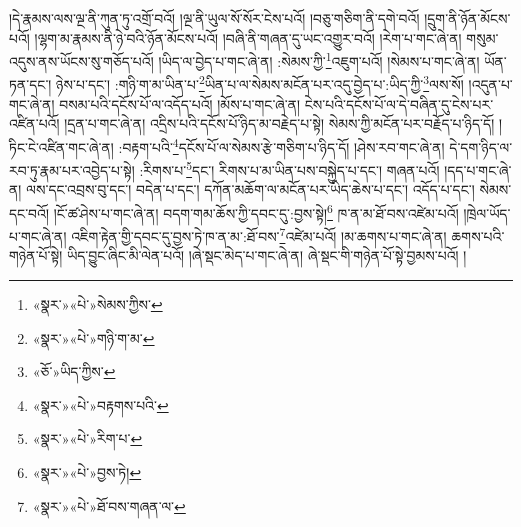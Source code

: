 །དེ་རྣམས་ལས་ལྔ་ནི་ཀུན་ཏུ་འགྲོ་བའོ། །ལྔ་ནི་ཡུལ་སོ་སོར་ངེས་པའོ། །བཅུ་གཅིག་ནི་དགེ་བའོ། །དྲུག་ནི་ཉོན་མོངས་པའོ། །ལྷག་མ་རྣམས་ནི་ཉེ་བའི་ཉོན་མོངས་པའོ། །བཞི་ནི་གཞན་དུ་ཡང་འགྱུར་བའོ། །རེག་པ་གང་ཞེ་ན། གསུམ་འདུས་ནས་ཡོངས་སུ་གཅོད་པའོ། །ཡིད་ལ་བྱེད་པ་གང་ཞེ་ན། :སེམས་ཀྱི་\footnote{«སྣར་»«པེ་»སེམས་ཀྱིས་}འཇུག་པའོ། །སེམས་པ་གང་ཞེ་ན། ཡོན་ཏན་དང་། ཉེས་པ་དང་། :གཉི་ག་མ་ཡིན་པ་\footnote{«སྣར་»«པེ་»གཉི་ག་མ་}ཡིན་པ་ལ་སེམས་མངོན་པར་འདུ་བྱེད་པ་:ཡིད་ཀྱི་\footnote{«ཅོ་»ཡིད་ཀྱིས་}ལས་སོ། །འདུན་པ་གང་ཞེ་ན། བསམ་པའི་དངོས་པོ་ལ་འདོད་པའོ། །མོས་པ་གང་ཞེ་ན། ངེས་པའི་དངོས་པོ་ལ་དེ་བཞིན་དུ་ངེས་པར་འཛིན་པའོ། །དྲན་པ་གང་ཞེ་ན། འདྲིས་པའི་དངོས་པོ་ཉིད་མ་བརྗེད་པ་སྟེ། སེམས་ཀྱི་མངོན་པར་བརྗོད་པ་ཉིད་དོ། །ཏིང་ངེ་འཛིན་གང་ཞེ་ན། :བརྟག་པའི་\footnote{«སྣར་»«པེ་»བརྟགས་པའི་}དངོས་པོ་ལ་སེམས་རྩེ་གཅིག་པ་ཉིད་དོ། །ཤེས་རབ་གང་ཞེ་ན། དེ་དག་ཉིད་ལ་རབ་ཏུ་རྣམ་པར་འབྱེད་པ་སྟེ། :རིགས་པ་\footnote{«སྣར་»«པེ་»རིག་པ་}དང་། རིགས་པ་མ་ཡིན་པས་བསྐྱེད་པ་དང་། གཞན་པའོ། །དད་པ་གང་ཞེ་ན། ལས་དང་འབྲས་བུ་དང་། བདེན་པ་དང་། དཀོན་མཆོག་ལ་མངོན་པར་ཡིད་ཆེས་པ་དང་། འདོད་པ་དང་། སེམས་དང་བའོ། །ངོ་ཚ་ཤེས་པ་གང་ཞེ་ན། བདག་གམ་ཆོས་ཀྱི་དབང་དུ་:བྱས་སྟེ།\footnote{«སྣར་»«པེ་»བྱས་ཏེ།} ཁ་ན་མ་ཐོ་བས་འཛེམ་པའོ། །ཁྲེལ་ཡོད་པ་གང་ཞེ་ན། འཇིག་རྟེན་གྱི་དབང་དུ་བྱས་ཏེ་ཁ་ན་མ་:ཐོ་བས་\footnote{«སྣར་»«པེ་»ཐོ་བས་གཞན་ལ་}འཛེམ་པའོ། །མ་ཆགས་པ་གང་ཞེ་ན། ཆགས་པའི་གཉེན་པོ་སྟེ། ཡིད་བྱུང་ཞིང་མི་ལེན་པའོ། །ཞེ་སྡང་མེད་པ་གང་ཞེ་ན། ཞེ་སྡང་གི་གཉེན་པོ་སྟེ་བྱམས་པའོ། །
